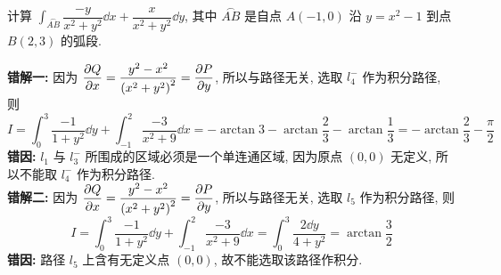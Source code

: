 \begin{example}
    计算 $\displaystyle\int_{\stackrel\frown{AB}}\dfrac{-y}{x^2+y^2}\dd x+\dfrac{x}{x^2+y^2}\dd y$, 其中 $\stackrel\frown{AB}$ 是自点 $A(-1,0)$ 沿 $y=x^2-1$ 到点 $B(2,3)$ 的弧段.
\end{example}
\begin{errorSolution}
    \textbf{错解一: }因为 $\displaystyle\pdv{Q}{x}=\dfrac{y^2-x^2}{\qty(x^2+y^2)^2}=\pdv{P}{y}$, 所以与路径无关, 选取 $l_4^-$ 作为积分路径, 则
    $$I=\int_{0}^{3}\dfrac{-1}{1+y^2}\dd y+\int_{-1}^{2}\dfrac{-3}{x^2+9}\dd x=-\arctan 3-\arctan\dfrac{2}{3}-\arctan\dfrac{1}{3}=-\arctan\dfrac{2}{3}-\dfrac{\pi}{2}$$
    \textbf{错因: }$l_1$ 与 $l_3^-$ 所围成的区域必须是一个单连通区域, 因为原点 $(0,0)$ 无定义, 所以不能取 $l_4^-$ 作为积分路径.\\
    \textbf{错解二: }因为 $\displaystyle\pdv{Q}{x}=\dfrac{y^2-x^2}{\qty(x^2+y^2)^2}=\pdv{P}{y}$, 所以与路径无关, 选取 $l_5$ 作为积分路径, 则
    $$I=\int_{0}^{3}\dfrac{-1}{1+y^2}\dd y+\int_{-1}^{2}\dfrac{-3}{x^2+9}\dd x=\int_{0}^{3}\dfrac{2\dd y}{4+y^2}=\arctan\dfrac{3}{2}$$
    \textbf{错因: }路径 $l_5$ 上含有无定义点 $(0,0)$, 故不能选取该路径作积分.\\
\end{errorSolution}
